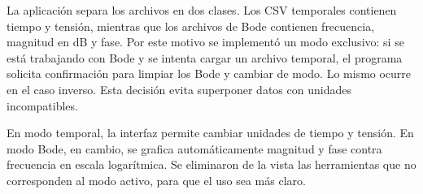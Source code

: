 La aplicación separa los archivos en dos clases. Los CSV temporales contienen tiempo y tensión, mientras que los archivos de Bode contienen frecuencia, magnitud en dB y fase. Por este motivo se implementó un modo exclusivo: si se está trabajando con Bode y se intenta cargar un archivo temporal, el programa solicita confirmación para limpiar los Bode y cambiar de modo. Lo mismo ocurre en el caso inverso. Esta decisión evita superponer datos con unidades incompatibles.

En modo temporal, la interfaz permite cambiar unidades de tiempo y tensión. En modo Bode, en cambio, se grafica automáticamente magnitud y fase contra frecuencia en escala logarítmica. Se eliminaron de la vista las herramientas que no corresponden al modo activo, para que el uso sea más claro.

